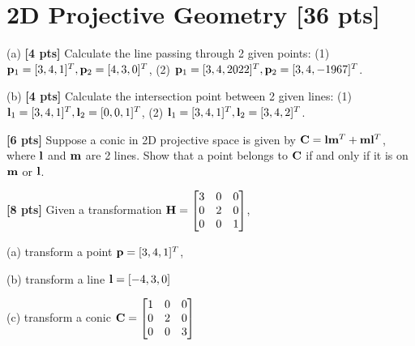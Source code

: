 \documentclass[11pt,addpoints,answers]{exam}
\numberwithin{equation}{section} %
\numberwithin{figure}{section} %
\numberwithin{table}{section} %
\begin{document}
\clearpage

\section{2D Projective Geometry  [36 pts]}
\begin{questions}

\question (a) \textbf{[4 pts]} Calculate the line passing through 2 given points: (1) $\mathbf{p}_1= [3,4,1]^T, \mathbf{p}_2 = [4,3,0]^T$, (2) $\mathbf{p}_1= [3,4,2022]^T, \mathbf{p}_2 = [3,4,-1967]^T$.

(b) \textbf{[4 pts]} Calculate the intersection point between 2 given lines: (1) $\mathbf{l}_1 = [3,4,1]^T, \mathbf{l}_2 = [0,0,1]^T $, (2) $\mathbf{l}_1= [3,4,1]^T, \mathbf{l}_2 = [3,4,2]^T$.

\begin{tcolorbox}[fit,height=5cm, width=\textwidth, blank, borderline={0.5pt}{-2pt},halign=left, valign=center, nobeforeafter]


\end{tcolorbox}

\question \textbf{[6 pts]} Suppose a conic in 2D projective space is given by $\mathbf{C} = \mathbf{l}\mathbf{m}^T + \mathbf{m}\mathbf{l}^T$, where $\mathbf{l}$ and $\mathbf{m}$ are 2 lines. Show that a point belongs to $\mathbf{C}$ if and only if it is on $\mathbf{m}$ or $\mathbf{l}$.

\begin{tcolorbox}[fit,height=5cm, width=\textwidth, blank, borderline={0.5pt}{-2pt},halign=left, valign=center, nobeforeafter]

\end{tcolorbox}

\question \textbf{[8 pts]} Given a transformation $\mathbf{H} = \begin{bmatrix}
                 3 & 0 & 0  \\
                 0 & 2 & 0  \\
                 0 & 0 & 1  \\
                \end{bmatrix}$,

(a) transform a point $\mathbf{p} = [3,4,1]^T$,

(b) transform a line $\mathbf{l} = [-4, 3, 0]$

(c) transform a conic $\mathbf{C} = \begin{bmatrix}
                 1 & 0 & 0  \\
                 0 & 2 & 0  \\
                 0 & 0 & 3  \\
                \end{bmatrix}$


\end{questions}
\end{document}
